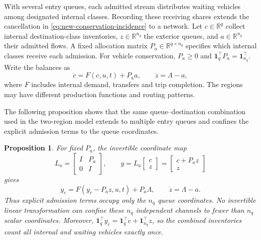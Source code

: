 \documentclass[preprint,12pt]{elsarticle}
\newtheorem{proposition}{Proposition}
\newcommand{\R}{\mathbb{R}}
\begin{document}
With several entry queues, each admitted stream distributes waiting vehicles
among designated internal classes. Recording these receiving shares extends
the cancellation in \eqref{eq:new-conservation-incidence} to a network.
Let $c\in\R^q$ collect internal destination-class inventories,
$z\in\R^{n_q}$ the exterior queues, and $a\in\R^{n_q}$ their admitted flows. A fixed
allocation matrix $P_a\in\R^{q\times n_q}$ specifies which internal classes
receive each admission. For vehicle conservation, $P_a\ge0$ and
$\mathbf1_q^\top P_a=\mathbf1_{n_q}^\top$. Write the balances as
\begin{equation}
 \dot c=F(c,u,t)+P_a a,\qquad \dot z=\Lambda-a,
 \label{eq:network-class-queue}
\end{equation}
where $F$ includes internal demand, transfers and trip completion. The
regions may have different production functions and routing patterns.

The following proposition shows that the same queue--destination combination
used in the two-region model extends to multiple entry queues and confines the
explicit admission terms to the queue coordinates.

\begin{proposition}
\label{prop:network-localization}
For fixed $P_a$, the invertible coordinate map
\begin{equation}
 L_a=\begin{bmatrix}I&P_a\\0&I\end{bmatrix},\qquad
 y=L_a\begin{bmatrix}c\\z\end{bmatrix}
   =\begin{bmatrix}c+P_a z\\z\end{bmatrix}
 \label{eq:network-transform}
\end{equation}
gives
\begin{equation}
 \dot y_c=F(y_c-P_a z,u,t)+P_a\Lambda,\qquad
 \dot z=\Lambda-a.
 \label{eq:network-transformed-flow}
\end{equation}
Thus explicit admission terms occupy only the $n_q$ queue coordinates. No
invertible linear transformation can confine these $n_q$ independent channels
to fewer than $n_q$ scalar coordinates. Moreover,
$\mathbf1_q^\top y_c=\mathbf1_q^\top c+\mathbf1_{n_q}^\top z$, so the combined
inventories count all internal and waiting vehicles exactly once.
\end{proposition}
\end{document}
